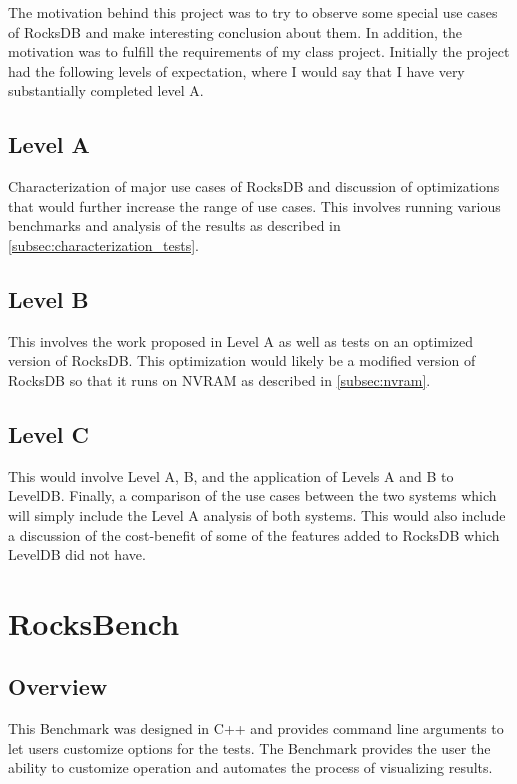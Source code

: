 \documentclass[twocolumn,11pt]{article}
\begin{document}
The motivation behind this project was to try to observe some special use cases
of RocksDB and make interesting conclusion about them. In addition, the
motivation was to fulfill the requirements of my class project. Initially the
project had the following levels of expectation, where I would say that I have
very substantially completed level A.

\subsection{Level A}

Characterization of major use cases of RocksDB and discussion of optimizations
that would further increase the range of use cases. This involves running
various benchmarks and analysis of the results as described in
\ref{subsec:characterization_tests}.

\subsection{Level B}

This involves the work proposed in Level A as well as tests on an optimized
version of RocksDB. This optimization would likely be a modified version of
RocksDB so that it runs on NVRAM as described in \ref{subsec:nvram}.

\subsection{Level C}

This would involve Level A, B, and the application of Levels A and B to LevelDB.
Finally, a comparison of the use cases between the two systems which will simply
include the Level A analysis of both systems. This would also include a
discussion of the cost-benefit of some of the features added to RocksDB which
LevelDB did not have.

\section{RocksBench}

\subsection{Overview}

This Benchmark was designed in C++ and provides command line arguments to let
users customize options for the tests. The Benchmark provides the user the
ability to customize operation and automates the process of visualizing results.
\end{document}
